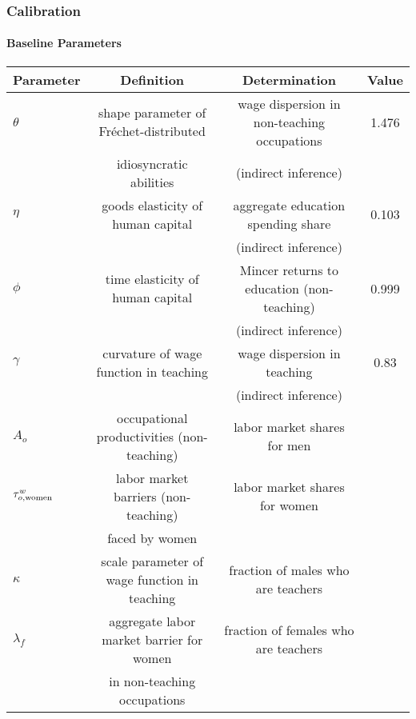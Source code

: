 \documentclass[11pt]{beamer}
\begin{document}
\begin{frame}
	\frametitle{Calibration}
	\framesubtitle{Baseline Parameters}
	\tiny
	\begin{table}[h!]
		\centering
		\begin{tabular}{lccc}
			\toprule
			Parameter & Definition & Determination & Value\\
			\midrule
			$\theta$ & shape parameter of Fr\'echet-distributed & wage dispersion in non-teaching occupations & 1.476\\
			& idiosyncratic abilities & (indirect inference) &\\
			$\eta$ & goods elasticity of human capital & aggregate education spending share  & 0.103\\
			& & (indirect inference) &\\
			$\phi$ & time elasticity of human capital & Mincer returns to education (non-teaching) & 0.999\\
			& & (indirect inference) &\\
			$\gamma$ & curvature of wage function in teaching & wage dispersion in teaching & 0.83\\
			&& (indirect inference) &\\
			\midrule
			$A_{o}$ & occupational productivities (non-teaching) & labor market shares for men & \\
			$\tau^{w}_{o,{\rm women}}$ & labor market barriers (non-teaching) & labor market shares for women &\\
			& faced by women & &\\
			$\kappa$ & scale parameter of wage function in teaching & fraction of males who are teachers &\\
			$\lambda_f$ & aggregate labor market barrier for women & fraction of females who are teachers &\\
			& in non-teaching occupations & &\\
			\bottomrule
		\end{tabular}
		\label{tab:param}
	\end{table}
\end{frame}
\end{document}
